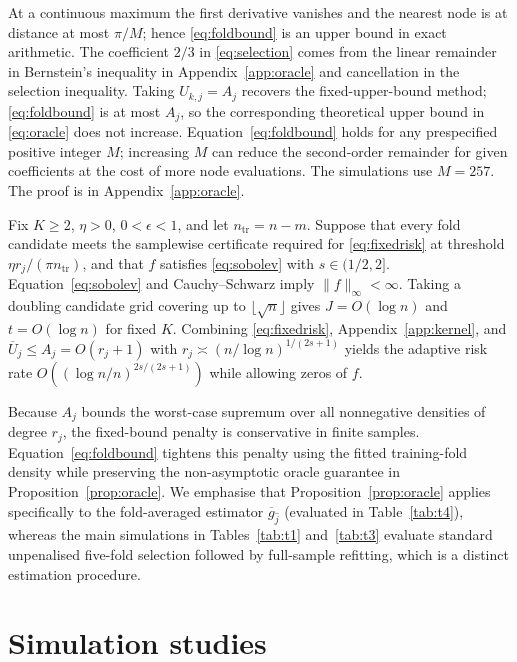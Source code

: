 At a continuous maximum the first derivative vanishes and the nearest node is at distance at most \(\pi/M\); hence \eqref{eq:foldbound} is an upper bound in exact arithmetic. The coefficient \(2/3\) in \eqref{eq:selection} comes from the linear remainder in Bernstein's inequality in Appendix~\ref{app:oracle} and cancellation in the selection inequality. Taking \(U_{k,j}=A_j\) recovers the fixed-upper-bound method; \eqref{eq:foldbound} is at most \(A_j\), so the corresponding theoretical upper bound in \eqref{eq:oracle} does not increase. Equation~\eqref{eq:foldbound} holds for any prespecified positive integer \(M\); increasing \(M\) can reduce the second-order remainder for given coefficients at the cost of more node evaluations. The simulations use \(M=257\). The proof is in Appendix~\ref{app:oracle}.

Fix \(K\ge2\), \(\eta>0\), \(0<\epsilon<1\), and let \(n_{\mathrm{tr}}=n-m\). Suppose that every fold candidate meets the samplewise certificate required for \eqref{eq:fixedrisk} at threshold \(\eta r_j/(\pi n_{\mathrm{tr}})\), and that \(f\) satisfies \eqref{eq:sobolev} with \(s\in(1/2,2]\). Equation~\eqref{eq:sobolev} and Cauchy--Schwarz imply \(\|f\|_\infty<\infty\). Taking a doubling candidate grid covering up to \(\lfloor\sqrt n\rfloor\) gives \(J=O(\log n)\) and \(t=O(\log n)\) for fixed \(K\). Combining \eqref{eq:fixedrisk}, Appendix~\ref{app:kernel}, and \(\overline U_j\le A_j=O(r_j+1)\) with \(r_j\asymp(n/\log n)^{1/(2s+1)}\) yields the adaptive risk rate \(O((\log n/n)^{2s/(2s+1)})\) while allowing zeros of \(f\).

Because \(A_j\) bounds the worst-case supremum over all nonnegative densities of degree \(r_j\), the fixed-bound penalty is conservative in finite samples. Equation~\eqref{eq:foldbound} tightens this penalty using the fitted training-fold density while preserving the non-asymptotic oracle guarantee in Proposition~\ref{prop:oracle}. We emphasise that Proposition~\ref{prop:oracle} applies specifically to the fold-averaged estimator \(\overline g_{\hat j}\) (evaluated in Table~\ref{tab:t4}), whereas the main simulations in Tables~\ref{tab:t1} and~\ref{tab:t3} evaluate standard unpenalised five-fold selection followed by full-sample refitting, which is a distinct estimation procedure.

\section{Simulation studies}\label{sec:sim}
